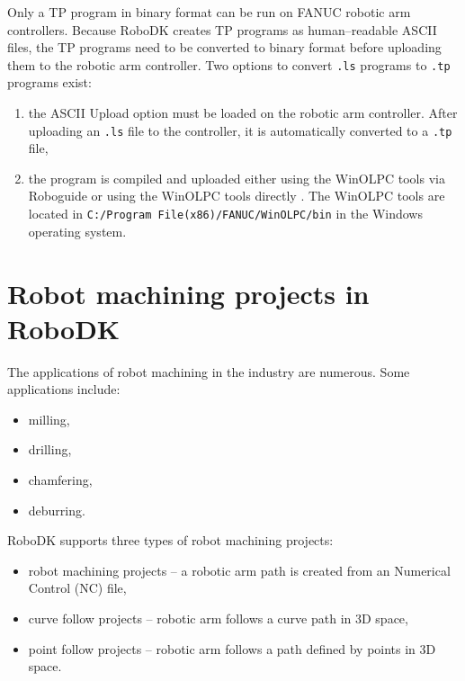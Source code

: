Only a TP program in binary format can be run on FANUC robotic arm controllers. Because RoboDK creates TP programs as human--readable ASCII files, the TP programs need to be converted to binary format before uploading them to the robotic arm controller. Two options to convert \texttt{.ls} programs to \texttt{.tp} programs exist:

\begin{enumerate}
\item the ASCII Upload option must be loaded on the robotic arm controller. After uploading an \texttt{.ls} file to the controller, it is automatically converted to a \texttt{.tp} file,
\item the program is compiled and uploaded either using the WinOLPC  tools via Roboguide or using the WinOLPC tools directly \cite{fanuchandling}. The WinOLPC tools are located in \texttt{C:/Program File(x86)/FANUC/WinOLPC/bin} in the Windows operating system.

\end{enumerate}

\section{Robot machining projects in RoboDK}

The applications of robot machining in the industry are numerous. Some applications include:

\begin{itemize}

    \item milling,
    \item drilling,
    \item chamfering,
    \item deburring.

\end{itemize}

RoboDK supports three types of robot machining projects:

\begin{itemize}

    \item robot machining projects -- a robotic arm path is created from an Numerical Control (NC) file,
    \item curve follow projects -- robotic arm follows a curve path in 3D space, 
    \item point follow projects -- robotic arm follows a path defined by points in 3D space.

\end{itemize}

